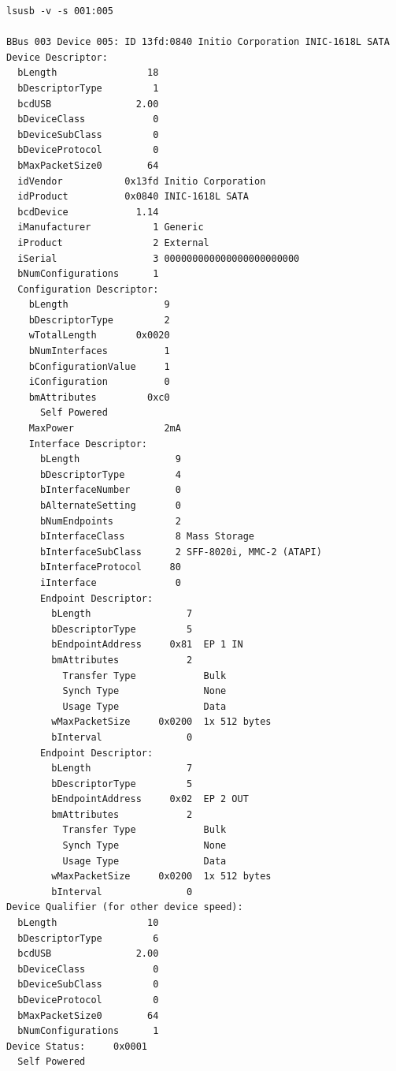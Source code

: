 \documentclass[mscthesis]{usiinfthesis}
\begin{document}
\begin{lstlisting}[language={},frame=single,breaklines=true,postbreak=\mbox{\textcolor{red}{$\hookrightarrow$}\space}]
lsusb -v -s 001:005

BBus 003 Device 005: ID 13fd:0840 Initio Corporation INIC-1618L SATA
Device Descriptor:
  bLength                18
  bDescriptorType         1
  bcdUSB               2.00
  bDeviceClass            0 
  bDeviceSubClass         0 
  bDeviceProtocol         0 
  bMaxPacketSize0        64
  idVendor           0x13fd Initio Corporation
  idProduct          0x0840 INIC-1618L SATA
  bcdDevice            1.14
  iManufacturer           1 Generic
  iProduct                2 External
  iSerial                 3 000000000000000000000000
  bNumConfigurations      1
  Configuration Descriptor:
    bLength                 9
    bDescriptorType         2
    wTotalLength       0x0020
    bNumInterfaces          1
    bConfigurationValue     1
    iConfiguration          0 
    bmAttributes         0xc0
      Self Powered
    MaxPower                2mA
    Interface Descriptor:
      bLength                 9
      bDescriptorType         4
      bInterfaceNumber        0
      bAlternateSetting       0
      bNumEndpoints           2
      bInterfaceClass         8 Mass Storage
      bInterfaceSubClass      2 SFF-8020i, MMC-2 (ATAPI)
      bInterfaceProtocol     80 
      iInterface              0 
      Endpoint Descriptor:
        bLength                 7
        bDescriptorType         5
        bEndpointAddress     0x81  EP 1 IN
        bmAttributes            2
          Transfer Type            Bulk
          Synch Type               None
          Usage Type               Data
        wMaxPacketSize     0x0200  1x 512 bytes
        bInterval               0
      Endpoint Descriptor:
        bLength                 7
        bDescriptorType         5
        bEndpointAddress     0x02  EP 2 OUT
        bmAttributes            2
          Transfer Type            Bulk
          Synch Type               None
          Usage Type               Data
        wMaxPacketSize     0x0200  1x 512 bytes
        bInterval               0
Device Qualifier (for other device speed):
  bLength                10
  bDescriptorType         6
  bcdUSB               2.00
  bDeviceClass            0 
  bDeviceSubClass         0 
  bDeviceProtocol         0 
  bMaxPacketSize0        64
  bNumConfigurations      1
Device Status:     0x0001
  Self Powered

\end{lstlisting}
\end{document}
